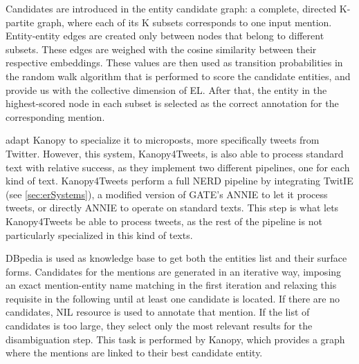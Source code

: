 Candidates are introduced in the entity candidate graph: a complete, directed K-partite graph, where each of its K subsets corresponds to one input mention. Entity-entity edges are created only between nodes that belong to different subsets. These edges are weighed with the cosine similarity between their respective embeddings. These values are then used as transition probabilities in the random walk algorithm that is performed to score the candidate entities, and provide us with the collective dimension of EL. After that, the entity in the highest-scored node in each subset is selected as the correct annotation for the corresponding mention.

\medskip

\cite{torres2016} adapt Kanopy to specialize it to microposts, more specifically tweets from Twitter. However, this system, Kanopy4Tweets, is also able to process standard text with relative success, as they implement two different pipelines, one for each kind of text. Kanopy4Tweets perform a full NERD pipeline by integrating TwitIE\cite{bontcheva2013} (see \autoref{sec:erSystems}), a modified version of GATE's ANNIE to let it process tweets, or directly ANNIE to operate on standard texts. This step is what lets Kanopy4Tweets be able to process tweets, as the rest of the pipeline is not particularly specialized in this kind of texts.

DBpedia is used as knowledge base to get both the entities list and their surface forms. Candidates for the mentions are generated in an iterative way, imposing an exact mention-entity name matching in the first iteration and relaxing this requisite in the following until at least one candidate is located. If there are no candidates, NIL resource is used to annotate that mention. If the list of candidates is too large, they select only the most relevant results for the disambiguation step. This task is performed by Kanopy, which provides a graph where the mentions are linked to their best candidate entity.

